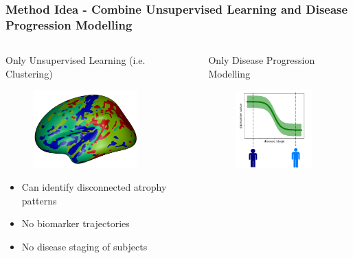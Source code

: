 \begin{frame}
\frametitle{Method Idea - Combine Unsupervised Learning and Disease Progression Modelling}

\vspace{-1em}

\begin{columns}[T]
  \begin{column}{.47\textwidth}
  
  \begin{center}
   
  Only Unsupervised Learning (i.e. Clustering)
  
  
  \begin{figure}
  \centering
  \includegraphics[height=3cm]{clust24_drcThFWHM0Initk-meansCl4Pr0Ra1Mrf5_VDPM_MRFPCA.png}
  \end{figure}
  \vspace{-1.5em}
 
  \begin{itemize}
   \item Can identify disconnected atrophy patterns \yes
   \item No biomarker trajectories \no
   \item No disease staging of subjects  \no
  \end{itemize}

 

  
  \end{center}  
  \end{column}
  \hspace{-2em}
  \vrule{}
  \begin{column}{.47\textwidth}
  \begin{center}
    
  Only Disease Progression Modelling
  
  
  \begin{figure}
    \centering
    \includegraphics[height=3cm,trim=120 0 120 0]{Disease_progression_one_sigmoid_confidence.png}
  \end{figure}
  \vspace{-1.5em}


\end{center}
\end{column}
\end{columns}
\end{frame}
